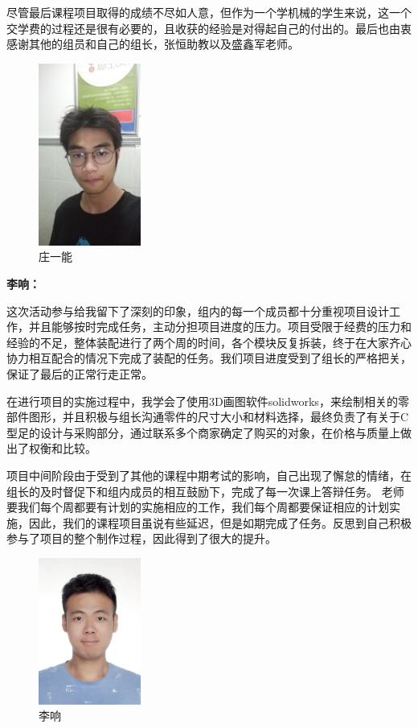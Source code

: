 \documentclass[12pt]{article}
\begin{document}
\begin{CJK}{UTF8}{gbsn}
尽管最后课程项目取得的成绩不尽如人意，但作为一个学机械的学生来说，这一个交学费的过程还是很有必要的，且收获的经验是对得起自己的付出的。最后也由衷感谢其他的组员和自己的组长，张恒助教以及盛鑫军老师。
\begin{figure}[H]
\centering
\includegraphics[width=0.3\textwidth]{photo//zyn.jpg}
\caption{庄一能}
\end{figure}
\textbf{李响：}\par
这次活动参与给我留下了深刻的印象，组内的每一个成员都十分重视项目设计工作，并且能够按时完成任务，主动分担项目进度的压力。项目受限于经费的压力和经验的不足，整体装配进行了两个周的时间，各个模块反复拆装，终于在大家齐心协力相互配合的情况下完成了装配的任务。我们项目进度受到了组长的严格把关，保证了最后的正常行走正常。\par
在进行项目的实施过程中，我学会了使用3D画图软件solidworks，来绘制相关的零部件图形，并且积极与组长沟通零件的尺寸大小和材料选择，最终负责了有关于C型足的设计与采购部分，通过联系多个商家确定了购买的对象，在价格与质量上做出了权衡和比较。\par
项目中间阶段由于受到了其他的课程中期考试的影响，自己出现了懈怠的情绪，在组长的及时督促下和组内成员的相互鼓励下，完成了每一次课上答辩任务。
老师要我们每个周都要有计划的实施相应的工作，我们每个周都要保证相应的计划实施，因此，我们的课程项目虽说有些延迟，但是如期完成了任务。反思到自己积极参与了项目的整个制作过程，因此得到了很大的提升。

\begin{figure}[H]
\centering
\includegraphics[width=0.3\textwidth]{photo//lx.jpg}
\caption{李响}
\end{figure}
\newpage

\end{CJK}
\end{document}
